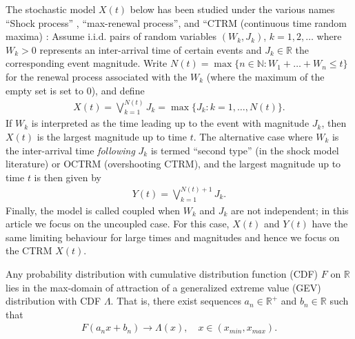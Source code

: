 \documentclass[12pt]{amsart}
\theoremstyle{definition}
\theoremstyle{remark}
\numberwithin{equation}{section}
\newcommand{\R}{\mathbb R}
\newcommand{\Rp}{\mathbb R^+}
\newcommand{\1}{\mathbf 1}
\begin{document}
The stochastic model $X(t)$ below has been studied under the various names
``Shock process''
\cite{Esary1973,Sumita1983,Sumita1984,Sumita1985,Anderson1987,Gut1999}, 
``max-renewal process'', 
\cite{Silvestrov2002a,ST04,Basrak2014a}
and ``CTRM (continuous time random maxima)
\cite{Benson2007,Meerschaert2007a,Hees14,Hees2015}: 
Assume i.i.d. pairs of random variables $(W_k, J_k)$, $k = 1, 2, \ldots$
where $W_k > 0$ represents an inter-arrival time of certain events and 
$J_k \in \R$ the corresponding event magnitude.  
Write $N(t) = \max\{n \in \mathbb N: W_1 + \ldots + W_n \le t\}$ for the renewal process
associated with the $W_k$ (where the maximum of the empty set is set to $0$), 
and define
\begin{align*}
X(t) = \bigvee_{k=1}^{N(t)} J_k
= \max\{J_k: k = 1, \ldots, N(t)\}.
\end{align*}
If $W_k$ is interpreted as the time leading up to the event with magnitude
$J_k$, then $X(t)$ is the largest magnitude up to time $t$.
The alternative case where $W_k$ is the inter-arrival time \textit{following} $J_k$ 
is termed ``second type'' (in the shock model literature) or OCTRM
(overshooting CTRM), and the largest magnitude up to time $t$ is then
given by
\begin{align*}
Y(t) = \bigvee_{k=1}^{N(t)+1} J_k.
\end{align*}
Finally, the model is called coupled when $W_k$ and $J_k$ are not independent;
in this article we focus on the uncoupled case.  For this case, $X(t)$ and
$Y(t)$ have the same limiting behaviour for large times and magnitudes
\cite{Hees2015} and hence we focus on the CTRM $X(t)$. 



Any probability distribution with cumulative distribution
function (CDF) $F$ on $\R$ lies in the max-domain of attraction
of a generalized extreme value (GEV) distribution with CDF $\Lambda$.
That is, there exist
sequences $a_n \in \Rp$ and $b_n \in \R$ such that
\begin{align*}
F(a_n x + b_n) \to \Lambda(x), \quad x \in (x_{min}, x_{max}). 
\end{align*}






\end{document}
